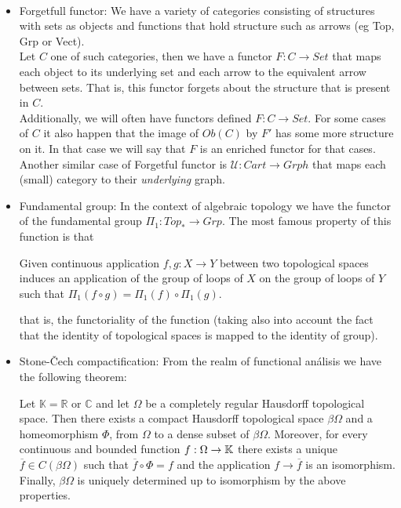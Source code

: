\begin{example}\ 
  \begin{itemize}
  \item {Forgetfull functor}: We have a variety of categories consisting of structures with sets as objects and functions that hold structure such as arrows (eg Top, Grp or Vect).\\
    
    Let $C$ one of such  categories, then we have a functor $F:C\to Set$ that maps each object to its underlying set and each arrow to the equivalent arrow between sets. That is, this functor forgets about the structure that is present in $C$.\\

    Additionally, we will often have functors defined $F:C\to Set$. For some cases of $C$ it also happen that the image of $Ob(C)$ by $F'$ has some more structure on it. In that case we will say that $F$ is an enriched functor for that cases.\\

    Another similar case of Forgetful functor is $\mathcal{U}:Cart \to Grph$ that maps each (small) category to their \emph{underlying} graph. 
  \item Fundamental group: In the context of algebraic topology we have the functor of the fundamental group $\Pi_1: Top_* \to Grp$. The most famous property of this function is that

    
    \begin{displayquote}
      Given continuous application $ f,g:X \to Y$ between two topological spaces induces an application of the group of loops of $X$ on the group of loops of $Y$ such that $\Pi_1(f \circ g) = \Pi_1(f) \circ \Pi_1(g)$.
    \end{displayquote}

    that is, the functoriality of the function (taking also into account the fact that the identity of topological spaces is mapped to the identity of group). 

  \item Stone-\v{C}ech compactification:  From the realm of functional análisis we have the following theorem:

    \begin{theorem} Let $\mathbb{K}=\mathbb R $ or $\mathbb C$ and let $\Omega$ be a completely regular Hausdorff topological space. Then there exists a compact Hausdorff topological space $\beta \Omega$ and a homeomorphism $\Phi$, from $\Omega$ to a dense subset of $\beta\Omega$. Moreover, for every continuous and bounded function $f: \Omega \to \mathbb{K}$ there exists a unique $\overline{f} \in C(\beta \Omega)$ such that $\overline{f}\circ \Phi = f$ and the application $f \to \overline{f}$ is an isomorphism. Finally, $\beta \Omega$ is uniquely determined up to isomorphism by the above properties.
    \end{theorem}
    \begin{remark}


\end{remark}
\end{itemize}
\end{example}
